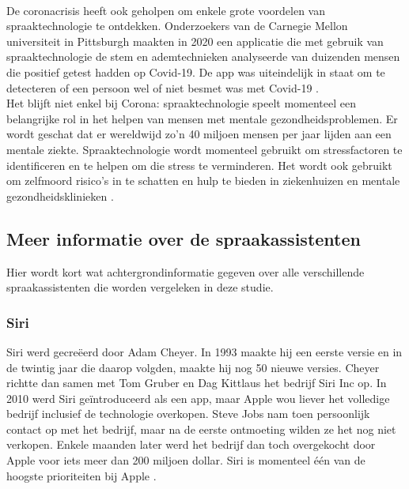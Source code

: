 \documentclass{hogent-article}
\begin{document}
\\\indent
De coronacrisis heeft ook geholpen om enkele grote voordelen van spraaktechnologie te ontdekken. Onderzoekers van de Carnegie Mellon universiteit in Pittsburgh maakten in 2020 een applicatie die met gebruik van spraaktechnologie de stem en ademtechnieken analyseerde van duizenden mensen die positief getest hadden op Covid-19. De app was uiteindelijk in staat om te detecteren of een persoon wel of niet besmet was met Covid-19 \autocite{Gujral2021}.
\\\indent
Het blijft niet enkel bij Corona: spraaktechnologie speelt momenteel een belangrijke rol in het helpen van mensen met mentale gezondheidsproblemen. Er wordt geschat dat er wereldwijd zo'n 40 miljoen mensen per jaar lijden aan een mentale ziekte. Spraaktechnologie wordt momenteel gebruikt om stressfactoren te identificeren en te helpen om die stress te verminderen. Het wordt ook gebruikt om zelfmoord risico's in te schatten en hulp te bieden in ziekenhuizen en mentale gezondheidsklinieken \autocite{Gujral2021}.

\subsection{Meer informatie over de spraakassistenten}
Hier wordt kort wat achtergrondinformatie gegeven over alle verschillende spraakassistenten die worden vergeleken in deze studie.
\subsubsection{Siri}
Siri werd gecreëerd door Adam Cheyer. In 1993 maakte hij een eerste versie en in de twintig jaar die daarop volgden, maakte hij nog 50 nieuwe versies. Cheyer richtte dan samen met Tom Gruber en Dag Kittlaus het bedrijf Siri Inc op. In 2010 werd Siri geïntroduceerd als een app, maar Apple wou liever het volledige bedrijf inclusief de technologie overkopen. Steve Jobs nam toen persoonlijk contact op met het bedrijf, maar na de eerste ontmoeting wilden ze het nog niet verkopen. Enkele maanden later werd het bedrijf dan toch overgekocht door Apple voor iets meer dan 200 miljoen dollar. Siri is momenteel één van de hoogste prioriteiten bij Apple \autocite{Randy}.
\end{document}
